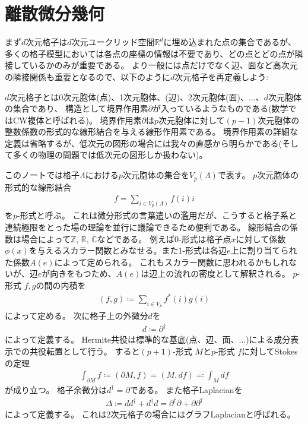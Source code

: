 \documentclass[12pt]{ltjsarticle}
\begin{document}
\section{離散微分幾何}
まず$d$次元格子は$d$次元ユークリッド空間$ℝ^d$に埋め込まれた点の集合であるが、多くの格子模型においては各点の座標の情報は不要であり、どの点とどの点が隣接しているかのみが重要である。
より一般には点だけでなく辺、面など高次元の隣接関係も重要となるので、以下のように$d$次元格子を再定義しよう:

$d$次元格子とは0次元胞体(点)、1次元胞体、(辺)、2次元胞体(面)、$…$、$d$次元胞体の集合であり、
構造として境界作用素$∂$が入っているようなものである(数学ではCW複体と呼ばれる)。
境界作用素$∂$は$p$次元胞体に対して$(p-1)$次元胞体の整数係数の形式的な線形結合を与える線形作用素である。
境界作用素の詳細な定義は省略するが、低次元の図形の場合には我々の直感から明らかである(そして多くの物理の問題では低次元の図形しか扱わない)。

このノートでは格子$Λ$における$p$次元胞体の集合を$V_p(Λ)$で表す。
$p$次元胞体の形式的な線形結合
\begin{align}
    f = ∑_{i ∈ V_p(Λ)} f(i) i
\end{align}
を$p$-形式と呼ぶ。
これは微分形式の言葉遣いの濫用だが、こうすると格子系と連続極限をとった場の理論を並行に議論できるため便利である。
線形結合の係数は場合によって$ℤ$, $ℝ$, $ℂ$などである。
例えば0-形式は格子点$x$に対して係数$ϕ(x)$を与えるスカラー関数とみなせる。また1-形式は各辺$e$上に割り当てられた係数$A(e)$によって定められる。
これもスカラー関数に思われるかもしれないが、辺$e$が向きをもつため、$A(e)$は辺上の流れの密度として解釈される。
$p$-形式 $f, g$の間の内積を
\begin{align}
    (f, g) ≔ ∑_{i ∈ V_p} f^*(i) g(i)
\end{align}
によって定める。
次に格子上の外微分$𝑑$を
\begin{align}
    𝑑 ≔ ∂^†
\end{align}
によって定義する。
Hermite共役は標準的な基底(点、辺、面、$…$)による成分表示での共役転置として行う。
すると$(p+1)$-形式 $M$と$p$-形式 $f$に対してStokesの定理
\begin{align}
    ∫_{∂M}f ≔ (∂M, f) = (M, 𝑑f) ≕ ∫_M 𝑑f
\end{align}
が成り立つ。
格子余微分は$𝑑^† = ∂$である。
また格子Laplacianを
\begin{align}
    Δ ≔ 𝑑𝑑^† + 𝑑^†𝑑 = ∂^†∂+∂∂^†
\end{align}
によって定義する。
これは2次元格子の場合にはグラフLaplacianと呼ばれる。
\end{document}
